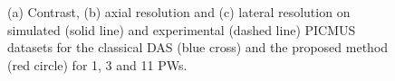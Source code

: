 \documentclass[conference]{IEEEtran}
\begin{document}
\begin{figure}[htb]
	\caption{(a) Contrast, (b) axial resolution and (c) lateral resolution on simulated (solid line) and experimental (dashed line) PICMUS datasets for the classical DAS (blue cross) and the proposed method (red circle) for 1, 3 and 11 PWs.}
\end{figure}
\newlength{\SimFigWidth} \setlength{\SimFigWidth}{0.22\textwidth}
\newlength{\SimFigHeight}
\end{document}
